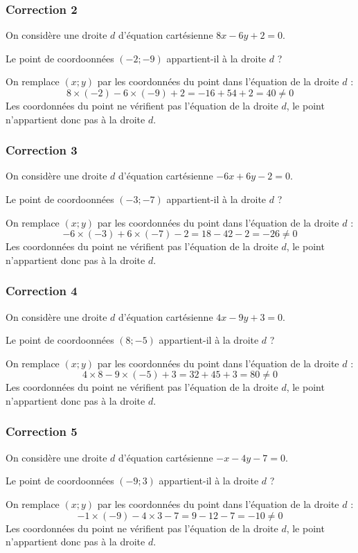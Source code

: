 \documentclass[15pt, mathserif]{beamer}
\begin{document}
\begin{frame}
\vspace{-10mm}
	\frametitle{Correction 2}
On considère une droite $d$ d'équation cartésienne $8x-6y+2=0$. 
 
 Le point de coordoonnées $(-2;-9)$ appartient-il à la droite $d$ ? 
 
  \bigskip 
 On remplace $(x; y)$ par les coordonnées du point dans l'équation de la droite $d$ : $$ 8\times \left(-2\right)-6\times\left(-9\right)+2= -16+54+2=40\neq 0 $$ 
 Les coordonnées du point ne vérifient pas l'équation de la droite $d$, le point n'appartient donc pas à la droite $d$.\end{frame}


\begin{frame}
\vspace{-10mm}
	\frametitle{Correction 3}
On considère une droite $d$ d'équation cartésienne $-6x+6y-2=0$. 
 
 Le point de coordoonnées $(-3;-7)$ appartient-il à la droite $d$ ? 
 
  \bigskip 
 On remplace $(x; y)$ par les coordonnées du point dans l'équation de la droite $d$ : $$ -6\times \left(-3\right)+6\times\left(-7\right)-2= 18-42-2=-26\neq 0 $$ 
 Les coordonnées du point ne vérifient pas l'équation de la droite $d$, le point n'appartient donc pas à la droite $d$.\end{frame}


\begin{frame}
\vspace{-10mm}
	\frametitle{Correction 4}
On considère une droite $d$ d'équation cartésienne $4x-9y+3=0$. 
 
 Le point de coordoonnées $(8;-5)$ appartient-il à la droite $d$ ? 
 
  \bigskip 
 On remplace $(x; y)$ par les coordonnées du point dans l'équation de la droite $d$ : $$ 4\times 8-9\times\left(-5\right)+3= 32+45+3=80\neq 0 $$ 
 Les coordonnées du point ne vérifient pas l'équation de la droite $d$, le point n'appartient donc pas à la droite $d$.\end{frame}


\begin{frame}
\vspace{-10mm}
	\frametitle{Correction 5}
On considère une droite $d$ d'équation cartésienne $-x-4y-7=0$. 
 
 Le point de coordoonnées $(-9;3)$ appartient-il à la droite $d$ ? 
 
  \bigskip 
 On remplace $(x; y)$ par les coordonnées du point dans l'équation de la droite $d$ : $$ -1\times \left(-9\right)-4\times3-7= 9-12-7=-10\neq 0 $$ 
 Les coordonnées du point ne vérifient pas l'équation de la droite $d$, le point n'appartient donc pas à la droite $d$.\end{frame}
\end{document}
